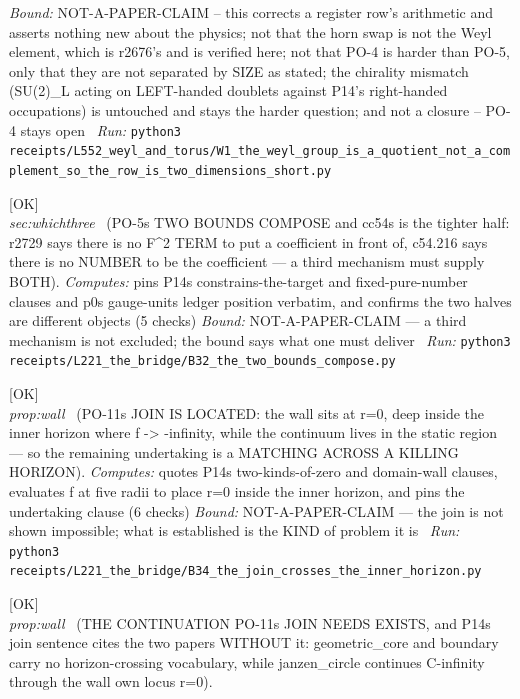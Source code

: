 \begin{description}
 \emph{Bound:} NOT-A-PAPER-CLAIM -- this corrects a register row's arithmetic and asserts nothing new about the physics; not that the horn swap is not the Weyl element, which is r2676's and is verified here; not that PO-4 is harder than PO-5, only that they are not separated by SIZE as stated; the chirality mismatch (SU(2)\_L acting on LEFT-handed doublets against P14's right-handed occupations) is untouched and stays the harder question; and not a closure -- PO-4 stays open
\ \emph{Run:} \texttt{python3 receipts/L552\_weyl\_and\_torus/W1\_the\_weyl\_group\_is\_a\_quotient\_not\_a\_complement\_so\_the\_row\_is\_two\_dimensions\_short.py}
\item[\label{rcpt:B32_the_two_bounds_compose}\textbf{}\quad\texttt{B32\_the\_two\_bounds\_compose}]\hfill\textsf{[OK]}\\
\textit{sec:whichthree} \ (PO-5s TWO BOUNDS COMPOSE and cc54s is the tighter half: r2729 says there is no F\textasciicircum{}2 TERM to put a coefficient in front of, c54.216 says there is no NUMBER to be the coefficient --- a third mechanism must supply BOTH). 
\emph{Computes:} pins P14s constrains-the-target and fixed-pure-number clauses and p0s gauge-units ledger position verbatim, and confirms the two halves are different objects (5 checks)
 \emph{Bound:} NOT-A-PAPER-CLAIM --- a third mechanism is not excluded; the bound says what one must deliver
\ \emph{Run:} \texttt{python3 receipts/L221\_the\_bridge/B32\_the\_two\_bounds\_compose.py}
\item[\label{rcpt:B34_the_join_crosses_the_inner_horizon}\textbf{}\quad\texttt{B34\_the\_join\_crosses\_the\_inner\_horizon}]\hfill\textsf{[OK]}\\
\textit{prop:wall} \ (PO-11s JOIN IS LOCATED: the wall sits at r=0, deep inside the inner horizon where f -> -infinity, while the continuum lives in the static region --- so the remaining undertaking is a MATCHING ACROSS A KILLING HORIZON). 
\emph{Computes:} quotes P14s two-kinds-of-zero and domain-wall clauses, evaluates f at five radii to place r=0 inside the inner horizon, and pins the undertaking clause (6 checks)
 \emph{Bound:} NOT-A-PAPER-CLAIM --- the join is not shown impossible; what is established is the KIND of problem it is
\ \emph{Run:} \texttt{python3 receipts/L221\_the\_bridge/B34\_the\_join\_crosses\_the\_inner\_horizon.py}
\item[\label{rcpt:B35_the_continuation_is_cited_wrong}\textbf{}\quad\texttt{B35\_the\_continuation\_is\_cited\_wrong}]\hfill\textsf{[OK]}\\
\textit{prop:wall} \ (THE CONTINUATION PO-11s JOIN NEEDS EXISTS, and P14s join sentence cites the two papers WITHOUT it: geometric\_core and boundary carry no horizon-crossing vocabulary, while janzen\_circle continues C-infinity through the wall own locus r=0). 

\end{description}
